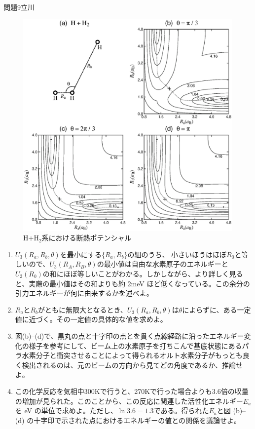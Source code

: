 \documentclass[fleqn]{jbook}
\begin{document}
\begin{question}{問題9}{立川}
\begin{enumerate}
\begin{figure}[b]
\begin{center}
\includegraphics[scale=.75]{2000physQ9_1.eps}
\end{center}
\caption{H$+$H$_2$系における断熱ポテンシャル}
\end{figure}
\begin{enumerate}
\item $U_3(R_a,R_b,\theta)$を最小にする$\{R_a,R_b\}$の組のうち、
小さいほうはほぼ$R_0$と等しいので、$U_3(R_A,R_B,\theta)$の最小値は自由な水素原子のエネルギーと$U_2(R_0)$の和にほぼ等しいことがわかる。しかしながら、より詳しく見ると、実際の最小値はその和よりも約 2meV ほど低くなっている。この余分の引力エネルギーが何に由来するかを述べよ。
\item $R_a$と$R_b$がともに無限大となるとき、$U_3(R_a,R_b,\theta)$は$\theta$によらずに、ある一定値に近づく。その一定値の具体的な値を求めよ。
\item 図(b)--(d)で、黒丸の点と十字印の点とを貫く点線経路に沿ったエネルギー変化の様子を参考にして、ビーム上の水素原子を打ちこんで基底状態にあるパラ水素分子と衝突させることによって得られるオルト水素分子がもっとも良く検出されるのは、元のビームの方向から見てどの角度であるか、推論せよ。
\item この化学反応を気相中300Kで行うと、270Kで行った場合よりも3.6倍の収量の増加が見られた。このことから、この反応に関連した活性化エネルギー$E_a$を eV の単位で求めよ。ただし、$\ln 3.6=1.3$である。得られた$E_a$と図 (b)--(d) の十字印で示された点におけるエネルギーの値との関係を議論せよ。
\end{enumerate}
\end{enumerate}
\end{question}
\end{document}
